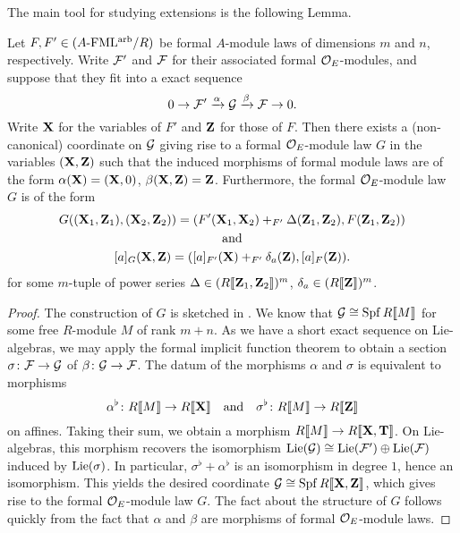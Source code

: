 \documentclass[../main.tex]{subfiles}
\begin{document}
The main tool for studying extensions is the following Lemma.
\begin{lem}\label{lem:SESStandardForm}
  Let $F, F' \in {({A}\textnormal-\allowbreak\mathrm{FML^{arb}}/{R})}$ be 
  formal $A$-module laws of dimensions $m$ and $n$, respectively. Write 
  $\mathcal{F}'$ and $\mathcal{F}$ for their associated formal $\mathcal{O}_E$-modules,
  and suppose that they fit into a exact sequence
  \begin{equation*}
    0 \to \mathcal{F}' \xrightarrow{\alpha} \mathcal{G} \xrightarrow{\beta} \mathcal{F} \to 0.
  \end{equation*}
  Write $\mathbf{X}$ for the variables of $F'$ and $\mathbf{Z}$ for those of $F$. Then 
  there exists a (non-canonical) coordinate on $\mathcal{G}$ giving rise to a formal
  $\mathcal{O}_E$-module law $G$ in the variables $(\mathbf{X}, \mathbf{Z})$ such that the induced morphisms
  of formal module laws are of the form 
  $\alpha(\mathbf{X}) = (\mathbf{X}, 0)$, $\beta(\mathbf{X}, \mathbf{Z}) = \mathbf{Z}$. Furthermore, 
  the formal $\mathcal{O}_E$-module law $G$ is of the form
  \begin{equation}\label{eq:SESStandardFormModuleLaw}
  \begin{gathered}
    G((\mathbf{X}_1, \mathbf{Z}_1), (\mathbf{X}_2, \mathbf{Z}_2)) = (F'(\mathbf{X}_1, \mathbf{X}_2) +_{F'} \Delta(\mathbf{Z}_1,
    \mathbf{Z}_2) , F(\mathbf{Z}_1, \mathbf{Z}_2)) \\
    \text{and} \\
    [a]_G(\mathbf{X}, \mathbf{Z}) = ([a]_{F'}(\mathbf{X}) +_{F'} \delta_a(\mathbf{Z}), [a]_F(\mathbf{Z})).
  \end{gathered}
  \end{equation}
  for some $m$-tuple of power series $\Delta \in (R\llbracket \mathbf{Z}_1, \mathbf{Z}_2 \rrbracket)^m$,
  $\delta_a \in (R\llbracket \mathbf{Z} \rrbracket)^m$. 
\begin{proof}
  The construction of $G$ is sketched in \cite[Proposition
  6.5]{hopkins1994equivariant}. We know that $\mathcal{G} \cong \operatorname{Spf} R\llbracket M \rrbracket$ 
  for some free $R$-module $M$ of rank $m+n$. As we have a short 
  exact sequence on Lie-algebras, we may apply the formal implicit function
  theorem to obtain a section 
  $\sigma\colon \mathcal{F} \to \mathcal{G}$ of $\beta\colon \mathcal{G} \to \mathcal{F}$. 
  The datum of the morphisms $\alpha$ and $\sigma$ is equivalent to 
  morphisms
  \begin{equation*}
    \alpha^\flat\colon R \llbracket M \rrbracket \to R \llbracket \mathbf{X} \rrbracket \quad \text{and} \quad
    \sigma^\flat\colon R \llbracket M \rrbracket \to R \llbracket \mathbf{Z} \rrbracket
  \end{equation*}
  on affines. Taking their sum, we obtain a morphism $R \llbracket M \rrbracket
  \to R\llbracket \mathbf{X}, \mathbf{T} \rrbracket$. On Lie-algebras, this morphism recovers the
  isomorphism $\operatorname{Lie}(\mathcal{G}) \cong \operatorname{Lie}(\mathcal{F}') \oplus \operatorname{Lie}(\mathcal{F})$ induced by 
  $\operatorname{Lie}(\sigma)$. In particular, $\sigma^\flat + \alpha^\flat$ is an isomorphism
  in degree $1$, hence an isomorphism. This yields the desired
  coordinate $\mathcal{G} \cong \operatorname{Spf} R\llbracket \mathbf{X}, \mathbf{Z}\rrbracket$, which gives rise 
  to the formal $\mathcal{O}_E$-module law $G$. The fact about the 
  structure of $G$ follows quickly from the fact that 
  $\alpha$ and $\beta$ are morphisms of formal $\mathcal{O}_E$-module laws. 
\end{proof}
\end{lem}
\end{document}
